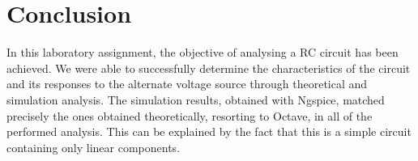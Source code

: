 \section{Conclusion}
\label{sec:conclusion}

In this laboratory assignment, the objective of analysing a RC circuit has been achieved. We were able to successfully determine the characteristics of the circuit and its responses to the alternate voltage source through theoretical and simulation analysis. The simulation results, obtained with Ngspice, matched precisely the ones obtained theoretically, resorting to Octave, in all of the performed analysis. This can be explained by the fact that this is a simple circuit containing only linear components. 
